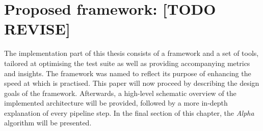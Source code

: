 
\chapter{Proposed framework: \velocity{} [TODO REVISE]}
\label{ch:velocity}
The implementation part of this thesis consists of a framework and a set of tools, tailored at optimising the test suite as well as providing accompanying metrics and insights. The framework was named \emph{\velocity{}} to reflect its purpose of enhancing the speed at which \CI{} is practised. This paper will now proceed by describing the design goals of the framework. Afterwards, a high-level schematic overview of the implemented architecture will be provided, followed by a more in-depth explanation of every pipeline step. In the final section of this chapter, the \emph{Alpha} algorithm will be presented.





